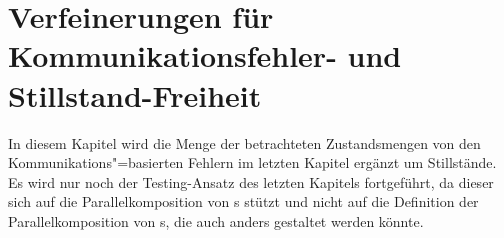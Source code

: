 \chapter{Verfeinerungen für Kommunikationsfehler- und Stillstand-Freiheit}

In diesem Kapitel wird die Menge der betrachteten Zustandsmengen von den
Kommunikations"=basierten Fehlern im letzten Kapitel ergänzt um Stillstände. Es
wird nur noch der Testing-Ansatz des letzten Kapitels fortgeführt, da dieser
sich auf die Parallelkomposition von \EIO{}s stützt und nicht auf die
Definition der Parallelkomposition von \MEIO{}s, die auch anders gestaltet
werden könnte.






